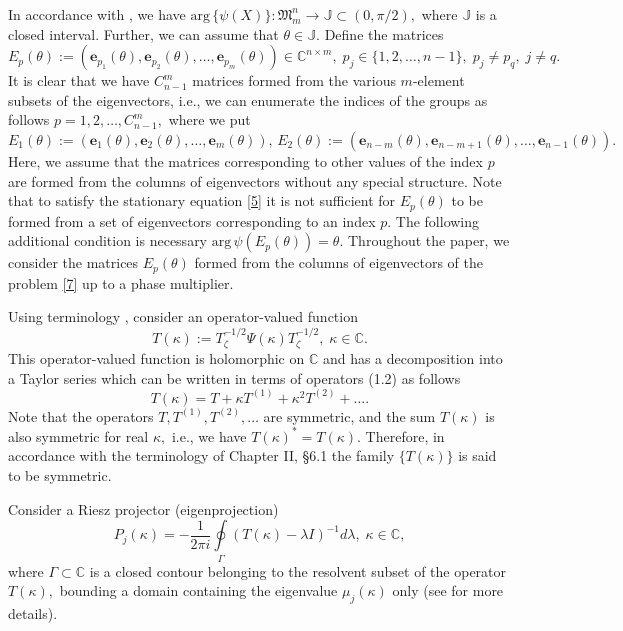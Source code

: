 \documentclass[a4paper,twoside,12pt]{article}
\begin{document}
In accordance with \cite{KABaChu26}, we have
$
\mathrm{arg} \,\{\psi(X)\}:\mathfrak{M}_{m}^{n}\rightarrow \mathbb{J} \subset (0,\pi/2),
$
where $\mathbb{J}$ is a closed interval.  Further, we can assume that $\theta\in \mathbb{J}.$ Define the matrices
$
E_{p}(\theta):=\left(\mathbf{e}_{ p_{1} }(\theta),\mathbf{e}_{ p_{2} }(\theta),\ldots,\mathbf{e}_{ p_{m} }(\theta)\right)\in \mathbb{C}^{n\times m},\;p_{j}\in \{1,2,\dots,n-1\},\;p_j\neq p_q,\;j\neq q.
$
It is clear that we have $C_{n-1}^{m}$ matrices formed from the various $m$-element  subsets of the eigenvectors, i.e., we can enumerate the indices of the groups as follows     $p=1,2,\dots,C_{n-1}^{m},$ where we put
 $E_{1}(\theta):=(\mathbf{e}_{ 1 }(\theta),\mathbf{e}_{ 2 }(\theta),\dots,\mathbf{e}_{ m }(\theta)),\,E_{2}(\theta):=(\mathbf{e}_{ n-m  }(\theta),\mathbf{e}_{ n-m+1  }(\theta),\dots,\mathbf{e}_{ n-1 }(\theta)).$
Here, we assume that  the   matrices corresponding to other values of the index $p$  are formed from  the columns  of eigenvectors without any special structure. Note that to satisfy the stationary equation \eqref{5} it is not sufficient for $E_p(\theta)$ to be formed from a set of eigenvectors corresponding to an index $p.$     The following additional condition is necessary $\mathrm{arg}\,\psi(E_{p}(\theta))=\theta.$ Throughout the paper, we consider the matrices $E_{p}(\theta)$ formed from the  columns of eigenvectors of the problem \eqref{7} up to a phase multiplier.











Using terminology \cite[p.63]{firstab_lit:kato1980}, consider an operator-valued function
$$
T(\kappa):=T^{-1/2}_{\zeta}\Psi(\kappa)T^{-1/2}_{\zeta},\;\kappa\in \mathbb{C}.
$$
This   operator-valued function is holomorphic on $\mathbb{C}$ and has a decomposition into a Taylor series which can be written in terms of operators (1.2)  \cite[p.63]{firstab_lit:kato1980} as follows
$$
T(\kappa)=T+\kappa T^{(1)}+\kappa^{2} T^{(2)}+\ldots .
$$
Note that the operators $T, T^{(1)},T^{(2)},\ldots$ are symmetric, and the sum  $T(\kappa)$ is also symmetric for real $\kappa,$ i.e.,  we have $T(\kappa)^{\ast}=T(\kappa).$ Therefore, in accordance with the terminology of Chapter II, \S 6.1 \cite[p.120]{firstab_lit:kato1980} the family $\{T(\kappa)\}$  is said to be symmetric.

Consider a Riesz projector (eigenprojection)
$$
  P_{j} (\kappa)=-\frac{1}{2\pi i}\oint\limits_{\Gamma}( T(\kappa)-\lambda I)^{-1}d\lambda,\;\kappa\in \mathbb{C},
$$
where  $\Gamma\subset \mathbb{C}$ is a closed contour  belonging to the resolvent subset of the operator $T(\kappa),$  bounding a domain containing the  eigenvalue $\mu_{j}(\kappa )$ only (see \cite{Kuk2025ess} for more details).
\end{document}
